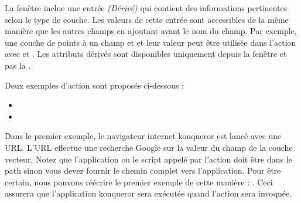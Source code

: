 La fenêtre  inclue une entrée {\em (Dérivé)} qui contient des informations pertinentes selon le type de couche. Les valeurs de cette entrée sont accessibles de la même manière que les autres champs en ajoutant  avant le nom du champ. Par exemple, une couche de points à un champ  et  et leur valeur peut être utilisée dans l'action avec  et . Les attributs dérivés sont disponibles uniquement depuis la fenêtre  et pas la .

Deux exemples d'action sont proposés ci-dessous : 

\begin{itemize}
  \item {}
  \item {}
\end{itemize}

Dans le premier exemple, le navigateur internet konqueror est lancé avec une URL. L'URL effectue une recherche Google sur la valeur du champ  de la couche vecteur. Notez que l'application ou le script appelé par l'action doit être dans le path sinon vous devez fournir le chemin complet vers l'application. Pour être certain, nous pouvons réécrire le premier exemple de cette manière : . Ceci assurera que l'application konqueror sera exécutée quand l'action sera invoquée.

